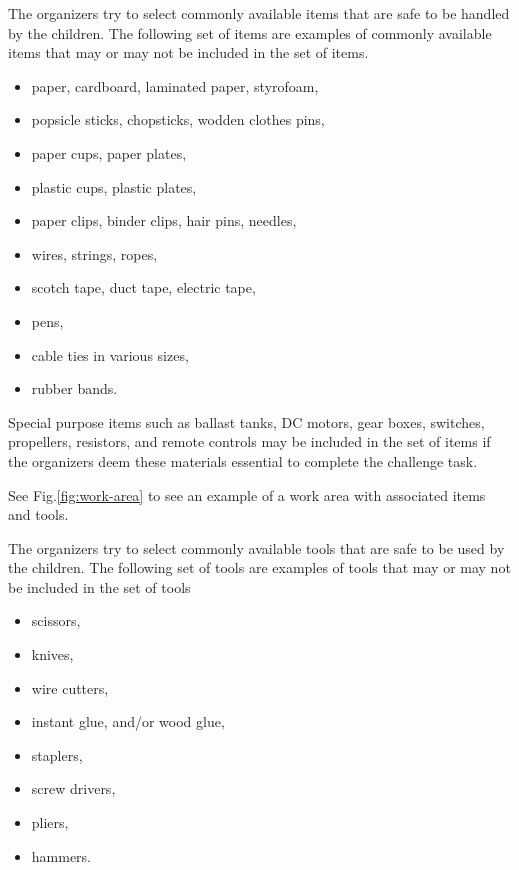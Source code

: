\documentclass[12pt]{hurocup}
\begin{document}
\begin{decisions}

\item \label{dec-items} The organizers try to select commonly
  available items that are safe to be handled by the children. The
  following set of items are examples of commonly available items that
  may or may not be included in the set of items.
  \begin{itemize}
    \item paper, cardboard, laminated paper, styrofoam, 
    \item popsicle sticks, chopsticks, wodden clothes pins,
    \item paper cups, paper plates,
    \item plastic cups, plastic plates,
    \item paper clips, binder clips, hair pins, needles,
    \item wires, strings, ropes, 
    \item scotch tape, duct tape, electric tape,
    \item pens,
    \item cable ties in various sizes,
    \item rubber bands.
  \end{itemize}

  Special purpose items such as ballast tanks, DC motors, gear boxes,
  switches, propellers, resistors, and remote controls may be included
  in the set of items if the organizers deem these materials essential
  to complete the challenge task.
      
  See Fig.\ref{fig:work-area} to see an example of a work area with
  associated items and tools.

\item \label{dec-tools} The organizers try to select commonly
  available tools that are safe to be used by the children. The
  following set of tools are examples of tools that may or may not be
  included in the set of tools

  \begin{itemize}
    \item scissors, 
    \item knives, 
    \item wire cutters,
    \item instant glue, and/or wood glue, 
    \item staplers,
    \item screw drivers,
    \item pliers,
    \item hammers.
  \end{itemize}
  

\end{decisions}
\end{document}
